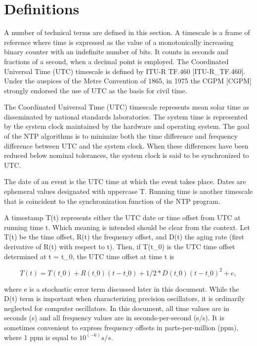 \chapter{Definitions}

A number of technical terms are defined in this section. A timescale
is a frame of reference where time is expressed as the value of a
monotonically increasing binary counter with an indefinite number of
bits. It counts in seconds and fractions of a second, when a decimal
point is employed. The Coordinated Universal Time (UTC) timescale is
defined by ITU-R TF.460 [ITU-R\_TF.460]. Under the auspices of the
Metre Convention of 1865, in 1975 the CGPM [CGPM] strongly endorsed
the use of UTC as the basis for civil time.

The Coordinated Universal Time (UTC) timescale represents mean solar
time as disseminated by national standards laboratories. The system
time is represented by the system clock maintained by the hardware
and operating system. The goal of the NTP algorithms is to minimize
both the time difference and frequency difference between UTC and the
system clock. When these differences have been reduced below nominal
tolerances, the system clock is said to be synchronized to UTC.

The date of an event is the UTC time at which the event takes place.
Dates are ephemeral values designated with uppercase T. Running time
is another timescale that is coincident to the synchronization
function of the NTP program.

A timestamp T(t) represents either the UTC date or time offset from
UTC at running time t. Which meaning is intended should be clear
from the context. Let T(t) be the time offset, R(t) the frequency
offset, and D(t) the aging rate (first derivative of R(t) with
respect to t). Then, if T(t\_0) is the UTC time offset determined at
t = t\_0, the UTC time offset at time t is

$$
T(t) = T(t\_0) + R(t\_0)(t-t\_0) + 1/2 * D(t\_0)(t-t\_0)^2 + e,
$$

where e is a stochastic error term discussed later in this document.
While the D(t) term is important when characterizing precision
oscillators, it is ordinarily neglected for computer oscillators. In
this document, all time values are in seconds (s) and all frequency
values are in seconds-per-second (s/s). It is sometimes convenient
to express frequency offsets in parts-per-million (ppm), where 1 ppm
is equal to $10^(-6) s/s$.

